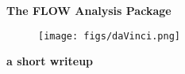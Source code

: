 \thispagestyle{empty}
\noindent
\begin{center}
{\LARGE \bf The FLOW Analysis Package}\\

\vspace{1.5cm}

\begin{figure}[hbt]
    \texttt{[image: figs/daVinci.png]}
\end{figure}

\vspace{1.5cm}
\noindent
{\large \bf a short writeup}\\

\end{center}

\clearpage
\thispagestyle{empty}
